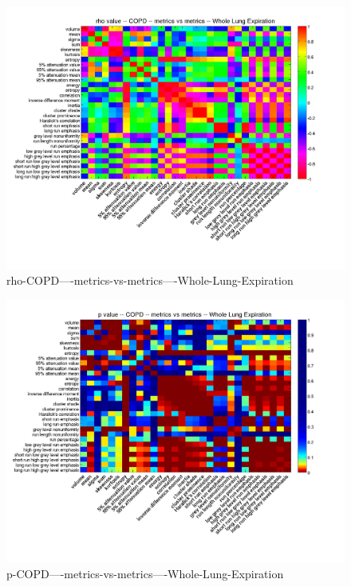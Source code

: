 \documentclass[12pt]{article}
\begin{document}
\clearpage
\begin{figure}
    \includegraphics[width=0.84\linewidth,viewport=100 60 620 550]{corr/rho-COPD----metrics-vs-metrics----Whole-Lung-Expiration.png}
    \caption{rho-COPD----metrics-vs-metrics----Whole-Lung-Expiration}
    \label{fig:rho-COPD----metrics-vs-metrics----Whole-Lung-Expiration}
\end{figure}
\begin{figure}
    \includegraphics[width=0.84\linewidth,viewport=100 60 620 550]{corr/p-COPD----metrics-vs-metrics----Whole-Lung-Expiration.png}
    \caption{p-COPD----metrics-vs-metrics----Whole-Lung-Expiration}
    \label{fig:p-COPD----metrics-vs-metrics----Whole-Lung-Expiration}
\end{figure}
\end{document}
